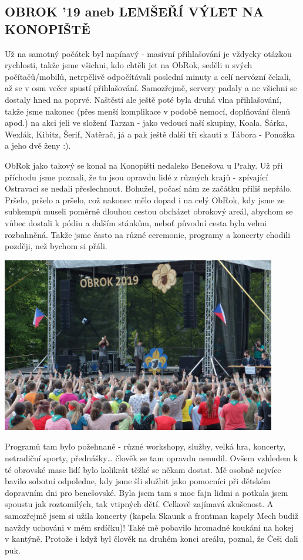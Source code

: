 \subsection*{OBROK '19 aneb LEMŠEŘÍ VÝLET NA KONOPIŠTĚ}
\label{sub:obrok19}

Už na samotný počátek byl napínavý - masivní přihlašování je vždycky otázkou rychlosti, takže jsme všichni, kdo chtěli jet na ObRok, seděli u svých počítačů/mobilů, netrpělivě odpočítávali poslední minuty a celí nervózní čekali, až se v osm večer spustí přihlašování. Samozřejmě, servery padaly a ne všichni se dostaly hned na poprvé. Naštěstí ale ještě poté byla druhá vlna přihlašování, takže jsme nakonec (přes menší komplikace v podobě nemocí, doplňování členů apod.) na akci jeli ve složení Tarzan - jako vedoucí naší skupiny, Koala, Šárka, Wexlák, Kibitz, Šerif, Natěrač, já a pak ještě další tři skauti z Tábora - Ponožka  a jeho dvě ženy :).


ObRok jako takový se konal na Konopišti nedaleko Benešova u Prahy. Už při příchodu jsme poznali, že tu jsou opravdu lidé z různých krajů - zpívající Ostravaci se nedali přeslechnout. Bohužel, počasí nám ze začátku příliš nepřálo. Pršelo, pršelo a pršelo, což nakonec mělo dopad i na celý ObRok, kdy jsme ze subkempů museli poměrně dlouhou cestou obcházet obrokový areál, abychom se vůbec dostali k pódiu a dalším stánkům, neboť původní cesta byla velmi rozbahněná. Takže jsme často na různé ceremonie, programy a koncerty chodili později, než bychom si přáli.

\begin{center}
	
\includegraphics[width=12cm]{img/rovero_clanky/obrok1.JPG}
\end{center}

Programů tam bylo požehnaně - různé workshopy, služby, velká hra, koncerty, netradiční sporty, přednášky… člověk se tam opravdu nenudil. Ovšem vzhledem k té obrovské mase lidí bylo kolikrát těžké se někam dostat. Mě osobně nejvíce bavilo sobotní odpoledne, kdy jsme šli službit jako pomocníci při dětském dopravním dni pro benešovské. Byla jsem tam s moc fajn lidmi a potkala jsem spoustu jak roztomilých, tak vtipných dětí. Celkově zajímavá zkušenost. A samozřejmě jsem si užila koncerty (kapela Skaunk a frontman kapely Mech budiž navždy uchováni v mém srdíčku)!
Také mě pobavilo hromadné koukání na hokej v kantýně. Protože i když byl člověk na druhém konci areálu, poznal, že Češi dali puk.


